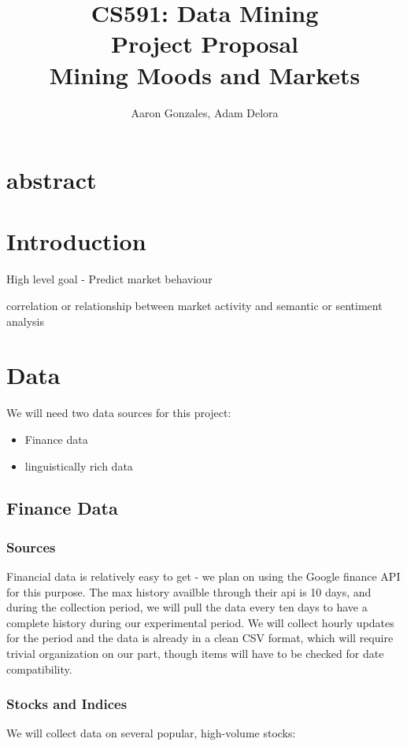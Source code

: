 \documentclass[titlepage]{article}\usepackage[]{graphicx}\usepackage[]{color}
\begin{document}
\title{CS591: Data Mining \\ Project Proposal \\ Mining Moods and Markets}
\author{Aaron Gonzales, Adam Delora}
\maketitle

\section{abstract}


\section{Introduction}


High level goal - Predict market behaviour

correlation or relationship between market activity and semantic or sentiment analysis






\section{Data}

We will need two data sources for this project: 
\begin{itemize}
	\item Finance data
	\item linguistically rich data
\end{itemize}

\subsection{Finance Data}
\subsubsection{Sources}
Financial data is relatively easy to get - we plan on using the Google finance
API for this purpose. The max history availble through their api is 10 days,
and during the collection period, we will pull the data every ten days to have
a complete history during our experimental period. We will collect hourly
updates for the period and the data is already in a clean CSV format, which
will require trivial organization on our part, though items will have to be
checked for date compatibility. 
\subsubsection{Stocks and Indices}
We will collect data on several popular, high-volume stocks:
\end{document}
